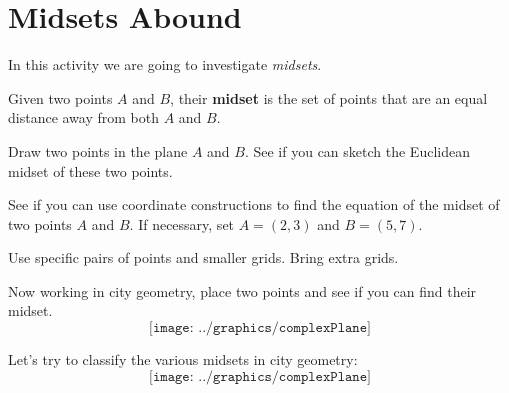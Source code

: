 \newpage
\section{Midsets Abound}
                                  

In this activity we are going to investigate \textit{midsets}.

\begin{definition}
Given two points $A$ and $B$, their \textbf{midset} is the set of points that are an equal distance away from both $A$ and $B$.
\end{definition}

\begin{prob} 
Draw two points in the plane $A$ and $B$. See if you can sketch the
Euclidean midset of these two points.
\end{prob}

\begin{prob}
See if you can use coordinate constructions to find the equation of
the midset of two points $A$ and $B$. If necessary, set $A = (2,3)$
and $B = (5,7)$.
\end{prob}

\newpage
\begin{teachingnote}
Use specific pairs of points and smaller grids.  Bring extra grids.
\end{teachingnote}  
\begin{prob}
Now working in city geometry, place two points and see if you can find
their midset.
\[
\texttt{[image: ../graphics/complexPlane]}
\]
\end{prob}

\newpage
\begin{prob}
Let's try to classify the various midsets in city geometry:
\[
\texttt{[image: ../graphics/complexPlane]}
\]
\end{prob}
